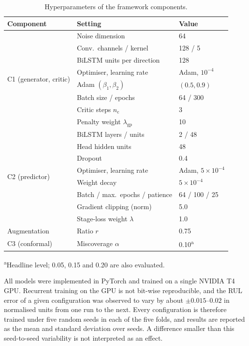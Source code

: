 \begin{table}[htbp]
\centering
\caption{Hyperparameters of the framework components.}
\label{tab:hyperparams}
\footnotesize
\renewcommand{\arraystretch}{1.15}
\begin{tabular}{lll}
\toprule
\textbf{Component} & \textbf{Setting} & \textbf{Value} \\
\midrule
\multirow{8}{*}{C1 (generator, critic)}
 & Noise dimension & 64 \\
 & Conv.\ channels / kernel & 128 / 5 \\
 & BiLSTM units per direction & 128 \\
 & Optimiser, learning rate & Adam, $10^{-4}$ \\
 & Adam $(\beta_1, \beta_2)$ & $(0.5, 0.9)$ \\
 & Batch size / epochs & 64 / 300 \\
 & Critic steps $n_{\mathrm{c}}$ & 3 \\
 & Penalty weight $\lambda_{\mathrm{gp}}$ & 10 \\
\midrule
\multirow{8}{*}{C2 (predictor)}
 & BiLSTM layers / units & 2 / 48 \\
 & Head hidden units & 48 \\
 & Dropout & 0.4 \\
 & Optimiser, learning rate & Adam, $5 \times 10^{-4}$ \\
 & Weight decay & $5 \times 10^{-4}$ \\
 & Batch / max.\ epochs / patience & 64 / 100 / 25 \\
 & Gradient clipping (norm) & 5.0 \\
 & Stage-loss weight $\lambda$ & 1.0 \\
\midrule
Augmentation & Ratio $r$ & 0.75 \\
C3 (conformal) & Miscoverage $\alpha$ & 0.10\textsuperscript{a} \\
\bottomrule
\end{tabular}

\vspace{2pt}
\raggedright\scriptsize \textsuperscript{a}Headline level; 0.05, 0.15
and 0.20 are also evaluated.
\end{table}

All models were implemented in PyTorch and trained on a single NVIDIA
T4 GPU. Recurrent training on the GPU is not bit-wise reproducible,
and the RUL error of a given configuration was observed to vary by
about $\pm 0.015$--$0.02$ in normalised units from one run to the
next. Every configuration is therefore trained under five random seeds
in each of the five folds, and results are reported as the mean and
standard deviation over seeds. A difference smaller than this
seed-to-seed variability is not interpreted as an effect.\\

